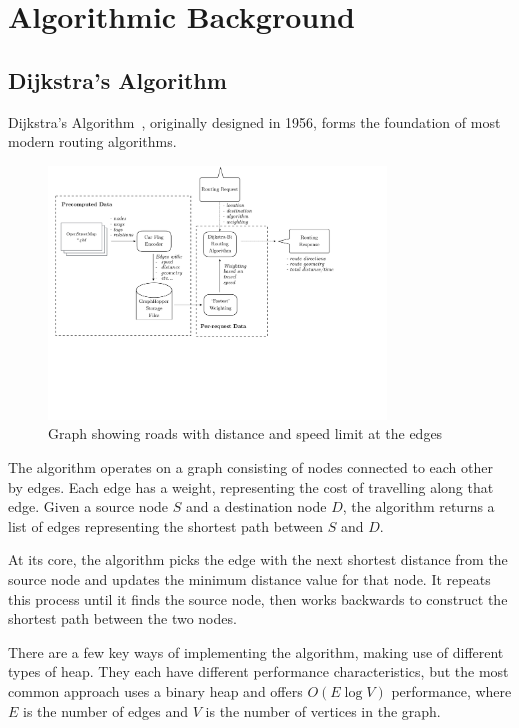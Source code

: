 \documentclass[ %
                    author={Alexander Hill},
                supervisor={Dr. Benjamin Sach},
                    degree={MEng},
                     title={MARMOSET},
                  subtitle={Multi-Agent Route Management using Online Simulation for Efficient Transportation},
                      type={research},
                      year={2016} ]{dissertation}
\begin{document}
\section{Algorithmic Background}

\subsection{Dijkstra's Algorithm}

Dijkstra's Algorithm~\cite{dijkstra}, originally designed in 1956, forms the
foundation of most modern routing algorithms.

\begin{figure}[h]
    \centering
    \includegraphics[page=7,clip,trim=0 10cm 12cm 0,width=0.8\textwidth]{architecture}
    \caption{Graph showing roads with distance and speed limit at the edges}\label{fig:graph-weights}
\end{figure}

The algorithm operates on a graph consisting of nodes connected to each other by
edges. Each edge has a weight, representing the cost of travelling along that
edge. Given a source node $S$ and a destination node $D$, the algorithm returns a list of edges
representing the shortest path between $S$ and $D$.

At its core, the algorithm picks the edge with the next shortest distance from
the source node and updates the minimum distance value for that node. It repeats
this process until it finds the source node, then works backwards to construct
the shortest path between the two nodes.

There are a few key ways of implementing the algorithm, making use of different
types of heap. They each have different performance characteristics, but the
most common approach uses a binary heap and offers $O(E\log V)$ performance,
where $E$ is the number of edges and $V$ is the number of vertices in the graph.
\end{document}
